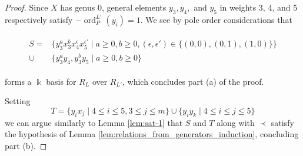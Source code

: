 \documentclass{amsart}
\theoremstyle{plain}
\theoremstyle{definition}
\theoremstyle{remark}
\numberwithin{equation}{section}
\newcommand\Bk{{\Bbbk}}
\DeclareMathOperator{\ord}{ord}
\newcommand{\halfcan}{L}
\DeclareMathOperator{\initial}{in_\prec}
\begin{document}
\begin{proof}
Since $X$ has genus 0, general
elements $y_3, y_4,$ and $y_5$ in weights 3, 4, and 5 respectively satisfy $-\ord_P^{\halfcan'}(y_i) =
1$. We see by pole order considerations that

\begin{align}
\label{eqn:add_one_generator}
	\begin{split}
		S=	&\{ y_3^ax_3^b x_4^\epsilon x_5^{\epsilon'} \mid a \geq 0, b 
		\geq 0,(\epsilon, \epsilon') \in \{(0,0),(0,1),(1,0)\} \} \\
		\cup \;&\{y_3^ay_4, y_3^by_5 \mid a \geq 0, b \geq 0 \}
	\end{split}
\end{align}

\noindent forms a $\Bk$ basis for $R_\halfcan$ over $R_{\halfcan'}$, which concludes part (a) of the proof.

Setting
\[
	T = \{ y_i x_j \mid 4 \leq i \leq 5, 3 \leq j \leq m\} \cup \{ y_i y_k \mid 4 \leq i \leq j \leq 5\} 
\]
we can argue similarly to Lemma \ref{lem:sat-1} that $S$ and $T$ along with $\prec$ satisfy the hypothesis of Lemma \ref{lem:relations_from_generators_induction}, concluding part (b).



%
%
%
%
%
%


\end{proof}
\end{document}
